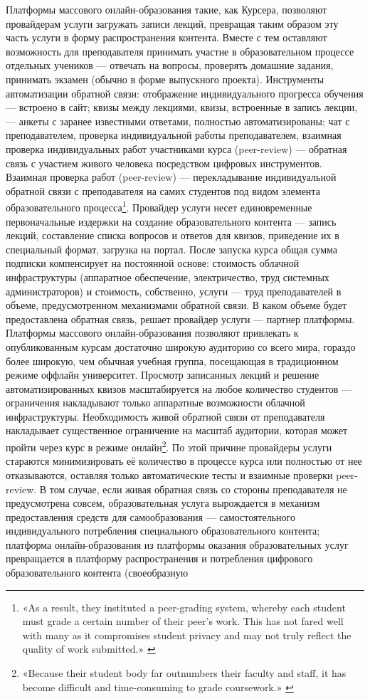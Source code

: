 \documentclass{article}
\begin{document}
Платформы массового онлайн-образования такие, как Курсера, позволяют провайдерам услуги загружать записи лекций, превращая таким образом эту часть услуги в форму распространения контента. Вместе с тем оставляют возможность для преподавателя принимать участие в образовательном процессе отдельных учеников — отвечать на вопросы, проверять домашние задания, принимать экзамен (обычно в форме выпускного проекта). Инструменты автоматизации обратной связи: отображение индивидуального прогресса обучения — встроено в сайт; квизы между лекциями, квизы, встроенные в запись лекции, — анкеты с заранее известными ответами, полностью автоматизированы; чат с преподавателем, проверка индивидуальной работы преподавателем, взаимная проверка индивидуальных работ участниками курса (peer-review) — обратная связь с участием живого человека посредством цифровых инструментов. Взаимная проверка работ (peer-review) — перекладывание индивидуальной обратной связи с преподавателя на самих студентов под видом элемента образовательного процесса\footnote{«As a result, they instituted a peer-grading system, whereby each student must grade a certain number of their peer's work. This has not fared well with many as it compromises student privacy and may not truly reflect the quality of work submitted.» \cite{howCourseraMakesMoney2022}}. Провайдер услуги несет единовременные первоначальные издержки на создание образовательного контента — запись лекций, составление списка вопросов и ответов для квизов, приведение их в специальный формат, загрузка на портал. После запуска курса общая сумма подписки компенсирует на постоянной основе: стоимость облачной инфраструктуры (аппаратное обеспечение, электричество, труд системных администраторов) и стоимость, собственно, услуги — труд преподавателей в объеме, предусмотренном механизмами обратной связи. В каком объеме будет предоставлена обратная связь, решает провайдер услуги — партнер платформы. Платформы массового онлайн-образования позволяют привлекать к опубликованным курсам достаточно широкую аудиторию со всего мира, гораздо более широкую, чем обычная учебная группа, посещающая в традиционном режиме оффлайн университет. Просмотр записанных лекций и решение автоматизированных квизов масштабируется на любое количество студентов — ограничения накладывают только аппаратные возможности облачной инфраструктуры. Необходимость живой обратной связи от преподавателя накладывает существенное ограничение на масштаб аудитории, которая может пройти через курс в режиме онлайн\footnote{«Because their student body far outnumbers their faculty and staff, it has become difficult and time-consuming to grade coursework.» \cite{howCourseraMakesMoney2022}}. По этой причине провайдеры услуги стараются минимизировать её количество в процессе курса или полностью от нее отказываются, оставляя только автоматические тесты и взаимные проверки peer-review. В том случае, если живая обратная связь со стороны преподавателя не предусмотрена совсем, образовательная услуга вырождается в механизм предоставления средств для самообразования — самостоятельного индивидуального потребления специального образовательного контента; платформа онлайн-образования из платформы оказания образовательных услуг превращается в платформу распространения и потребления цифрового образовательного контента (своеобразную 
\end{document}
